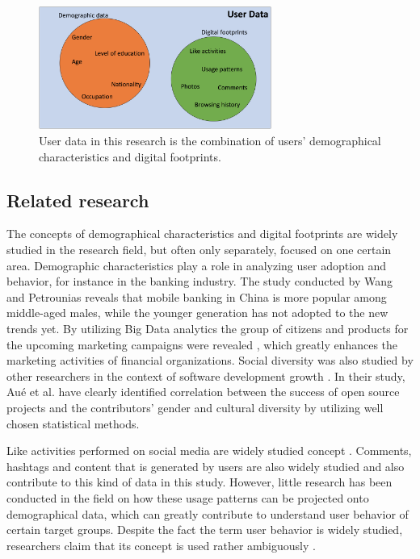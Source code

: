 \begin{figure}[h] 
  \begin{center}
    \includegraphics[width=3in]{Images/user_data_venn.png}
    \caption{User data in this research is the combination of users' demographical characteristics and digital footprints.}
    \label{user_data_venn}
  \end{center}
\end{figure}

\subsection{Related research}
The concepts of demographical characteristics and digital footprints are widely studied in the research field, but often only separately, focused on one certain area. Demographic characteristics play a role in analyzing user adoption and behavior, for instance in the banking industry. The study conducted by Wang and Petrounias \cite{chinesemobilebankingusers} reveals that mobile banking in China is more popular among middle-aged males, while the younger generation has not adopted to the new trends yet. By utilizing Big Data analytics the group of citizens and products for the upcoming marketing campaigns were revealed \cite{chinesemobilebankingusers}, which greatly enhances the marketing activities of financial organizations. Social diversity was also studied by other researchers in the context of software development growth \cite{socialdiversityongithub}. In their study, Aué et al. \cite{socialdiversityongithub} have clearly identified correlation between the success of open source projects and the contributors' gender and cultural diversity by utilizing well chosen statistical methods. 

Like activities performed on social media are widely studied concept \cite{bakhshi2014faces, jang2015noreciprocity, jang2016teensengagemorewithfewerphotos, ottoni2013ladies}. Comments, hashtags and content that is generated by users are also widely studied \cite{bakhshi2014faces, jang2016teensengagemorewithfewerphotos, hu2014we, bakhshi2014faces} and also contribute to this kind of data in this study. However, little research has been conducted in the field on how these usage patterns can be projected onto demographical data, which can greatly contribute to understand user behavior of certain target groups. Despite the fact the term user behavior is widely studied, researchers claim that its concept is used rather ambiguously \cite{waheed2017investigation}.

